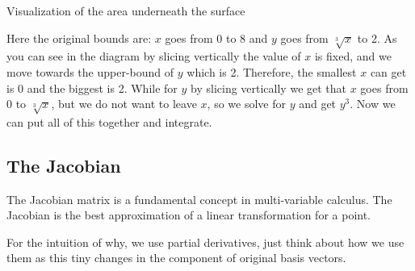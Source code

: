 \begin{center}

    Visualization of the area underneath the surface
    \smallskip

\end{center}

Here the original bounds are: \(x\) goes from 0 to 8 and \(y\) goes from \(\sqrt[3]{x}\) to 2.
As you can see in the diagram by slicing vertically the value of \(x\) is fixed, and we move 
towards the upper-bound of \(y\) which is 2.
Therefore, the smallest \(x\) can get is 0 and the biggest is 2. While for \(y\) by slicing 
vertically we get that \(x\) goes from 0 to \(\sqrt[3]{x}\), but 
we do not want to leave \(x\), so we solve for \(y\) and get \(y^3\). 
Now we can put all of this together and integrate.

\subsection{The Jacobian}

The Jacobian matrix is a fundamental concept in multi-variable calculus. The Jacobian is the best
approximation of a linear transformation for a point.

For the intuition of why, we use partial derivatives, just think about
how we use them as this tiny changes in the component of original
basis vectors.

